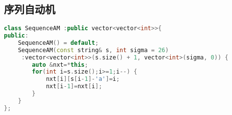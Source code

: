 \subsection{序列自动机}
\begin{lstlisting}[language=c++]
class SequenceAM :public vector<vector<int>>{
public:
    SequenceAM() = default;
    SequenceAM(const string& s, int sigma = 26)
     :vector<vector<int>>(s.size() + 1, vector<int>(sigma, 0)) {
        auto &nxt=*this;
        for(int i=s.size();i>=1;i--) {
            nxt[i][s[i-1]-'a']=i;
            nxt[i-1]=nxt[i];
        }
    }
};
\end{lstlisting}